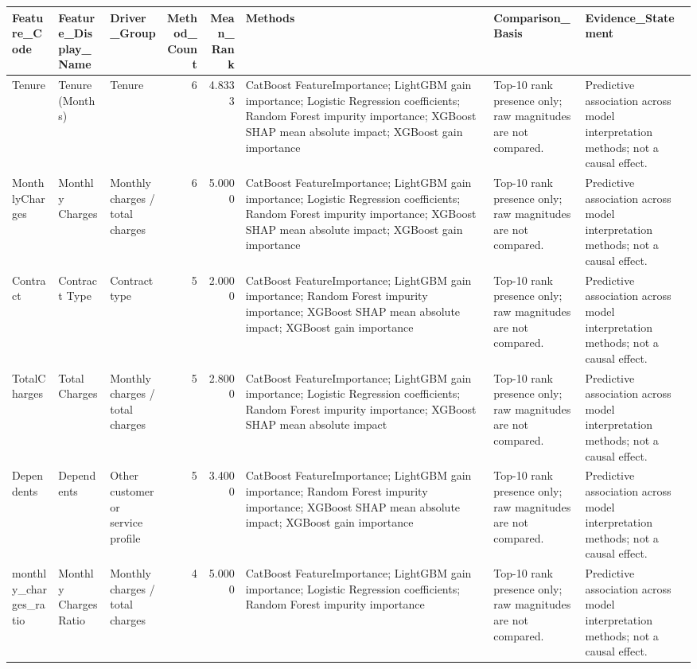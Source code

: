 \begin{tabular}{lllrrlll}
\toprule
Feature_Code & Feature_Display_Name & Driver_Group & Method_Count & Mean_Rank & Methods & Comparison_Basis & Evidence_Statement \\
\midrule
Tenure & Tenure (Months) & Tenure & 6 & 4.8333 & CatBoost FeatureImportance; LightGBM gain importance; Logistic Regression coefficients; Random Forest impurity importance; XGBoost SHAP mean absolute impact; XGBoost gain importance & Top-10 rank presence only; raw magnitudes are not compared. & Predictive association across model interpretation methods; not a causal effect. \\
MonthlyCharges & Monthly Charges & Monthly charges / total charges & 6 & 5.0000 & CatBoost FeatureImportance; LightGBM gain importance; Logistic Regression coefficients; Random Forest impurity importance; XGBoost SHAP mean absolute impact; XGBoost gain importance & Top-10 rank presence only; raw magnitudes are not compared. & Predictive association across model interpretation methods; not a causal effect. \\
Contract & Contract Type & Contract type & 5 & 2.0000 & CatBoost FeatureImportance; LightGBM gain importance; Random Forest impurity importance; XGBoost SHAP mean absolute impact; XGBoost gain importance & Top-10 rank presence only; raw magnitudes are not compared. & Predictive association across model interpretation methods; not a causal effect. \\
TotalCharges & Total Charges & Monthly charges / total charges & 5 & 2.8000 & CatBoost FeatureImportance; LightGBM gain importance; Logistic Regression coefficients; Random Forest impurity importance; XGBoost SHAP mean absolute impact & Top-10 rank presence only; raw magnitudes are not compared. & Predictive association across model interpretation methods; not a causal effect. \\
Dependents & Dependents & Other customer or service profile & 5 & 3.4000 & CatBoost FeatureImportance; LightGBM gain importance; Random Forest impurity importance; XGBoost SHAP mean absolute impact; XGBoost gain importance & Top-10 rank presence only; raw magnitudes are not compared. & Predictive association across model interpretation methods; not a causal effect. \\
monthly_charges_ratio & Monthly Charges Ratio & Monthly charges / total charges & 4 & 5.0000 & CatBoost FeatureImportance; LightGBM gain importance; Logistic Regression coefficients; Random Forest impurity importance & Top-10 rank presence only; raw magnitudes are not compared. & Predictive association across model interpretation methods; not a causal effect. \\

\end{tabular}
